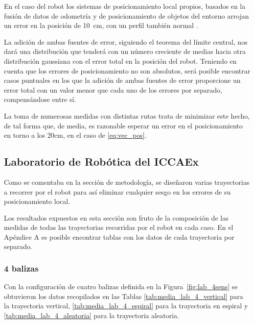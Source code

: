 En el caso del robot los sistemas de posicionamiento local propios, basados en la fusión de datos de odometría y de posicionamiento de objetos del entorno arrojan un error en la posición de 10~cm, con un perfil también normal \cite{POSRobot}.

La adición de ambas fuentes de error, siguiendo el teorema del límite central, nos dará una distribución que tenderá con un número creciente de medias hacia otra distribución gaussiana con el error total en la posición del robot.
Teniendo en cuenta que los errores de posicionamiento no son absolutos, será posible encontrar casos puntuales en los que la adición de ambas fuentes de error proporcione un error total con un valor menor que cada uno de los errores por separado, compensándose entre sí.

La toma de numerosas medidas con distintas rutas trata de minimizar este hecho, de tal forma que, de media, es razonable esperar un error en el posicionamiento en torno a los 20cm, en el caso de \eqref{eq:vec_pos}.

\subsection{Laboratorio de Robótica del ICCAEx}

Como se comentaba en la sección de metodología, se diseñaron varias trayectorias a recorrer por el robot para así eliminar cualquier sesgo en los errores de su posicionamiento local.

Los resultados expuestos en esta sección son fruto de la composición de las medidas de todas las trayectorias recorridas por el robot en cada caso.
En el Apéndice A es posible encontrar tablas con los datos de cada trayectoria por separado.

\subsubsection{4 balizas}

Con la configuración de cuatro balizas definida en la Figura~\ref{fig:lab_4sens} se obtuvieron los datos recopilados en las Tablas \ref{tab:media_lab_4_vertical} para la trayectoria vertical, \ref{tab:media_lab_4_espiral} para la trayectoria en espiral y \ref{tab:media_lab_4_aleatoria} para la trayectoria aleatoria.

